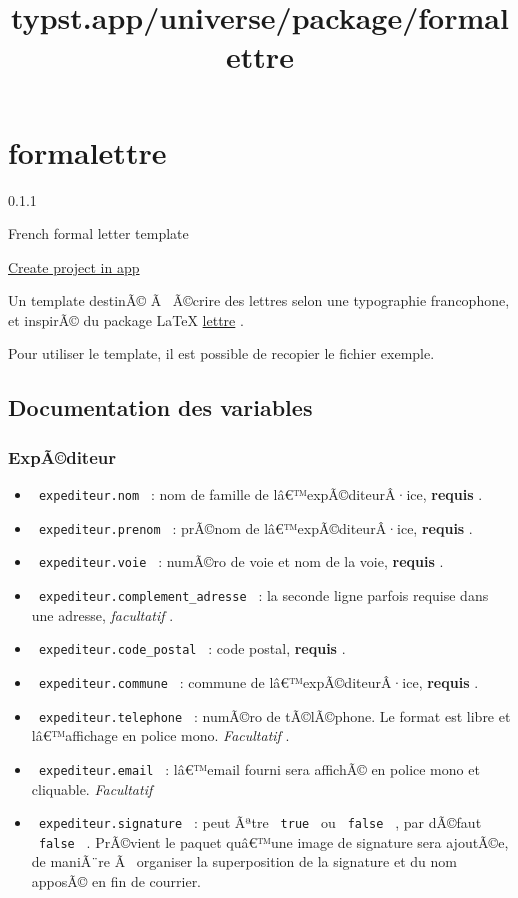 \title{typst.app/universe/package/formalettre}

\label{banner}
\label{template-thumbnail}

\section{formalettre}\label{formalettre}

{ 0.1.1 }

French formal letter template

\href{/app?template=formalettre&version=0.1.1}{Create project in app}

\label{readme}
Un template destinÃ© Ã~ Ã©crire des lettres selon une typographie
francophone, et inspirÃ© du package LaTeX
\href{https://ctan.org/pkg/lettre}{lettre} .

Pour utiliser le template, il est possible de recopier le fichier
exemple.

\subsection{Documentation des
variables}\label{documentation-des-variables}

\subsubsection{ExpÃ©diteur}\label{expuxe3diteur}

\begin{itemize}
\tightlist
\item
  \texttt{\ expediteur.nom\ } : nom de famille de lâ€™expÃ©diteurÂ·ice,
  \textbf{requis} .
\item
  \texttt{\ expediteur.prenom\ } : prÃ©nom de lâ€™expÃ©diteurÂ·ice,
  \textbf{requis} .
\item
  \texttt{\ expediteur.voie\ } : numÃ©ro de voie et nom de la voie,
  \textbf{requis} .
\item
  \texttt{\ expediteur.complement\_adresse\ } : la seconde ligne parfois
  requise dans une adresse, \emph{facultatif} .
\item
  \texttt{\ expediteur.code\_postal\ } : code postal, \textbf{requis} .
\item
  \texttt{\ expediteur.commune\ } : commune de lâ€™expÃ©diteurÂ·ice,
  \textbf{requis} .
\item
  \texttt{\ expediteur.telephone\ } : numÃ©ro de tÃ©lÃ©phone. Le format
  est libre et lâ€™affichage en police mono. \emph{Facultatif} .
\item
  \texttt{\ expediteur.email\ } : lâ€™email fourni sera affichÃ© en
  police mono et cliquable. \emph{Facultatif}
\item
  \texttt{\ expediteur.signature\ } : peut Ãªtre \texttt{\ true\ } ou
  \texttt{\ false\ } , par dÃ©faut \texttt{\ false\ } . PrÃ©vient le
  paquet quâ€™une image de signature sera ajoutÃ©e, de maniÃ¨re Ã~
  organiser la superposition de la signature et du nom apposÃ© en fin de
  courrier.
\end{itemize}

